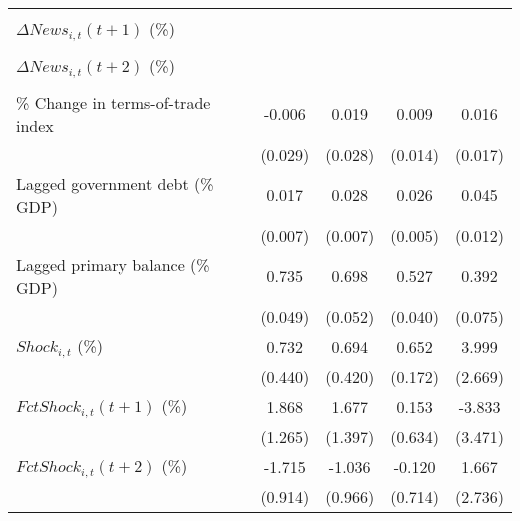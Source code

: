 {\begin{tabular}{l*{4}{c}}
                    &                     &                     &                     &                     \\
\addlinespace
$ \Delta News_{i,t}(t+1)$ (\%)&                     &                     &                     &                     \\
                    &                     &                     &                     &                     \\
\addlinespace
$ \Delta News_{i,t}(t+2)$ (\%)&                     &                     &                     &                     \\
                    &                     &                     &                     &                     \\
\addlinespace
\% Change in terms-of-trade index&      -0.006         &       0.019         &       0.009         &       0.016         \\
                    &     (0.029)         &     (0.028)         &     (0.014)         &     (0.017)         \\
\addlinespace
Lagged government debt (\% GDP)&       0.017\sym{**} &       0.028\sym{***}&       0.026\sym{***}&       0.045\sym{***}\\
                    &     (0.007)         &     (0.007)         &     (0.005)         &     (0.012)         \\
\addlinespace
Lagged primary balance (\% GDP)&       0.735\sym{***}&       0.698\sym{***}&       0.527\sym{***}&       0.392\sym{***}\\
                    &     (0.049)         &     (0.052)         &     (0.040)         &     (0.075)         \\
\addlinespace
$ Shock_{i,t}$ (\%) &       0.732         &       0.694         &       0.652\sym{***}&       3.999         \\
                    &     (0.440)         &     (0.420)         &     (0.172)         &     (2.669)         \\
\addlinespace
$ FctShock_{i,t}(t+1)$ (\%)&       1.868         &       1.677         &       0.153         &      -3.833         \\
                    &     (1.265)         &     (1.397)         &     (0.634)         &     (3.471)         \\
\addlinespace
$ FctShock_{i,t}(t+2)$ (\%)&      -1.715\sym{*}  &      -1.036         &      -0.120         &       1.667         \\
                    &     (0.914)         &     (0.966)         &     (0.714)         &     (2.736)         \\

\end{tabular}}
